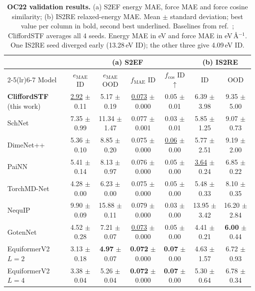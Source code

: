 \begin{table}[!htbp]
\centering
\caption{\textbf{OC22 validation results.} (a) S2EF energy MAE, force MAE and force cosine similarity; (b) IS2RE relaxed-energy MAE. Mean $\pm$ standard deviation; best value per column in bold, second best underlined. Baselines from ref.~; CliffordSTF averages all 4 seeds. Energy MAE in eV and force MAE in eV\,\AA$^{-1}$. One IS2RE seed diverged early (13.28\,eV ID); the other three give 4.09\,eV ID.}
\label{tab:oc22_full}
\fontsize{8.5}{10.5}\selectfont
\setlength{\tabcolsep}{3pt}
\begin{tabular*}{\textwidth}{@{\extracolsep{\fill}}lcccccc@{}}
\toprule
& \multicolumn{4}{c}{\textbf{(a) S2EF}} & \multicolumn{2}{c}{\textbf{(b) IS2RE}} \\
\cmidrule(lr){2-5}\cmidrule(lr){6-7}
Model & $e_\mathrm{MAE}$ ID & $e_\mathrm{MAE}$ OOD & $f_\mathrm{MAE}$ ID & $f_\mathrm{cos}$ ID$\uparrow$ & ID & OOD \\
\midrule
\textbf{CliffordSTF} (this work) & \underline{2.92} $\pm$ 0.11 & 5.17 $\pm$ 0.19 & \underline{0.073} $\pm$ 0.000 & 0.05 $\pm$ 0.01 & 6.39 $\pm$ 3.98 & 9.35 $\pm$ 5.00 \\
\midrule
SchNet & 7.35 $\pm$ 0.99 & 11.34 $\pm$ 1.47 & 0.077 $\pm$ 0.001 & 0.03 $\pm$ 0.01 & 5.85 $\pm$ 1.25 & 9.07 $\pm$ 0.73 \\
DimeNet++ & 5.36 $\pm$ 0.10 & 8.85 $\pm$ 0.20 & 0.075 $\pm$ 0.000 & \underline{0.06} $\pm$ 0.00 & 5.77 $\pm$ 2.51 & 9.19 $\pm$ 2.00 \\
PaiNN & 5.41 $\pm$ 0.14 & 8.13 $\pm$ 0.97 & 0.076 $\pm$ 0.000 & 0.05 $\pm$ 0.00 & \underline{3.64} $\pm$ 0.24 & 6.85 $\pm$ 0.22 \\
TorchMD-Net & 4.28 $\pm$ 0.00 & 6.23 $\pm$ 0.00 & 0.075 $\pm$ 0.000 & 0.05 $\pm$ 0.00 & 5.48 $\pm$ 0.33 & 8.10 $\pm$ 0.35 \\
NequIP & 9.90 $\pm$ 0.09 & 15.88 $\pm$ 0.11 & 0.079 $\pm$ 0.000 & 0.03 $\pm$ 0.00 & 13.95 $\pm$ 3.42 & 16.20 $\pm$ 2.84 \\
GotenNet & 4.52 $\pm$ 0.28 & 7.21 $\pm$ 0.07 & \underline{0.073} $\pm$ 0.000 & 0.05 $\pm$ 0.00 & 4.41 $\pm$ 0.21 & \textbf{6.00} $\pm$ 0.44 \\
EquiformerV2 $L{=}2$ & 3.13 $\pm$ 0.18 & \textbf{4.97} $\pm$ 0.07 & \textbf{0.072} $\pm$ 0.000 & \textbf{0.07} $\pm$ 0.00 & 4.63 $\pm$ 1.57 & 6.72 $\pm$ 0.93 \\
EquiformerV2 $L{=}4$ & 3.38 $\pm$ 0.04 & 5.26 $\pm$ 0.04 & \textbf{0.072} $\pm$ 0.000 & \textbf{0.07} $\pm$ 0.00 & 5.30 $\pm$ 0.64 & 6.78 $\pm$ 0.34 \\

\end{tabular*}
\end{table}
